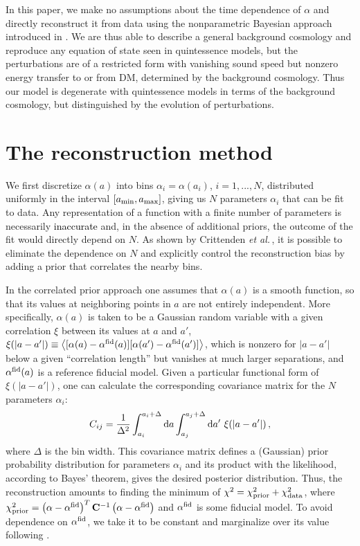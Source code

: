 \documentclass[prd,twocolumn,preprintnumbers,amsmath,amssymb,nofootinbib,english,showpacs]{revtex4-1}
\newcommand{\dr}{\textcolor{black}}
\def\etal{{\frenchspacing\it et al.}}
\def\be{\begin{equation}}
\def\ee{\end{equation}}
\def\d{\rm d}
\def\p{{\rm prior}}
\def\fid{{\rm fid}}
\begin{document}
In this paper, we make no assumptions about the time dependence of $\alpha$ and directly reconstruct it from data using the nonparametric Bayesian approach introduced in \cite{Crittenden:2011Dec}. We are thus able to describe a general background cosmology and reproduce any equation of state seen in quintessence models, but the perturbations are of a restricted form with vanishing sound speed but nonzero energy transfer to or from DM, determined by the background cosmology. Thus our model is degenerate with quintessence models in terms of the background cosmology, but distinguished by the evolution of perturbations.

\section{The reconstruction method}

We first discretize $\alpha(a)$ into bins $\alpha_i = \alpha(a_i)$, $i=1,...,N$, distributed uniformly in the interval $[a_{\rm min}, a_{\rm max}]$, giving us $N$ parameters $\alpha_i$ that can be fit to data. Any representation of a function with a finite number of parameters is necessarily \dr{inaccurate} and, in the absence of additional priors, the outcome of the fit would directly depend on $N$. As shown by Crittenden \etal \,\cite{Crittenden:2011Dec}, it is possible to eliminate the dependence on $N$ and explicitly control the reconstruction bias by adding a prior that correlates the nearby bins.

In the correlated prior approach one assumes that $\alpha(a)$ is a smooth function, so that its values at neighboring points in $a$ are not entirely independent. More specifically, $\alpha(a)$ is taken to be a Gaussian random variable with a given correlation $\xi$ between its values at $a$ and $a'$, $\xi (|a - a'|) \equiv \left\langle [\alpha(a) - \alpha^{\rm fid}(a)][\alpha(a') - \alpha^{\rm fid}(a')] \right\rangle$, which is nonzero for $|a-a'|$ below a given ``correlation length'' but vanishes at much larger separations, and $\alpha^{\rm fid}(a)$ is a reference fiducial model. Given a particular functional form of $\xi (|a - a'|)$, one can calculate the corresponding covariance matrix for the $N$ parameters $\alpha_i$:
\be
\label{eq:Cij} C_{ij}=\frac{1}{\Delta^2}\int_{a_i}^{a_i+\Delta}{\d}a \int_{a_j}^{a_j+\Delta}{\d}a'~\xi (|a - a'|) \,,
\ee
where $\Delta$ is the bin width. This covariance matrix defines a (Gaussian) prior probability distribution for parameters $\alpha_i$ and its product with the likelihood, according to Bayes' theorem, gives the desired posterior distribution. Thus, the reconstruction amounts to finding the minimum of $\chi^2=\chi_{\rm prior}^2+\chi_{\rm data}^2$, where $\chi_{\p}^2=\left(\mathbf{\alpha}-\mathbf{\alpha}^{\fid}\right)^T \mathbf{C}^{-1} \left(\mathbf{\alpha}-\mathbf{\alpha}^{\fid}\right)$ and $\mathbf{\alpha}^{\fid}$ is
some fiducial model. To avoid dependence on $\mathbf{\alpha}^{\fid}$, we take it to be constant and marginalize over its value following \cite{Crittenden:2011Dec}.
\end{document}
